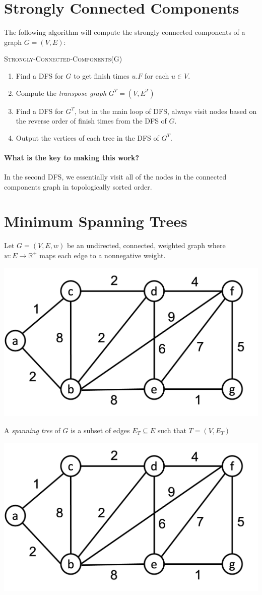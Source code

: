\documentclass[11  pt]{exam}
\begin{document}
	\section{Strongly Connected Components}
	The following algorithm will compute the strongly connected components of a graph $G = (V,E)$:
	
	\textsc{Strongly-Connected-Components}(G)
	\begin{enumerate}
		\item Find a DFS for $G$ to get finish times $u.F$ for each $u \in V$.
		\item Compute the \emph{transpose graph} $G^T = (V,E^T)$
		\item Find a DFS for $G^T$, but in the main loop of DFS, always visit nodes based on the reverse order of finish times from the DFS of $G$.
		\item Output the vertices of each tree in the DFS of $G^T$. 
	\end{enumerate}
	\newpage
	\paragraph{What is the key to making this work?}
	In the second DFS, we essentially visit all of the nodes in the connected components graph in topologically sorted order.
	
	
\newpage
	\section{Minimum Spanning Trees}
Let $G = (V,E,w)$ be an undirected, connected, weighted graph where $w \colon E \rightarrow \mathbb{R}^+$ maps each edge to a nonnegative weight.


\begin{center}
	\includegraphics[width = .5\linewidth]{mst-graph.png}
\end{center}

A \emph{spanning tree} of $G$ is a subset of edges $E_T \subseteq E$ such that $T = (V,E_T)$  

\begin{center}
	\includegraphics[width = .5\linewidth]{mst-graph.png}
\end{center}
\end{document}
